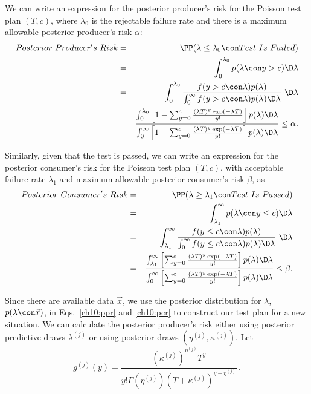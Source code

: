 \documentclass {book}
\begin{document}
We can write an expression for the posterior producer's
risk for the Poisson test
plan $(T,c)$, where $\lambda_{0}$ is
the rejectable failure rate and there is a maximum allowable
posterior producer's risk $\alpha$:
\begin{eqnarray}\label{ch10:ppr}
Posterior\mbox{ }Producer's\mbox{ }Risk & = &
\PP(\lambda \leq \lambda_{0}\con Test\mbox{ }Is\mbox{ }Failed)\\
\mbox{} & = & \int_{0}^{\lambda_0} p(\lambda \con y > c) \D \lambda \nonumber\\
\mbox{} & = & \int_{0}^{\lambda_0} \frac{f(y > c \con \lambda)
p(\lambda)}{\int_{0}^{\infty} f(y > c \con \lambda) p(\lambda) \D \lambda} \,\, \D \lambda \nonumber\\
\mbox{} & = & \frac{\int_{0}^{\lambda_0} \left[1-
\sum^{c}_{y=0}\frac{(\lambda T)^y \exp(-\lambda T)}{y!} \right]
p(\lambda) \D \lambda}{\int_{0}^{\infty} \left[ 1- \sum^{c}_{y=0}
\frac{(\lambda T)^y \exp(-\lambda T)}{y!} \right] p(\lambda) \D
\lambda}\nonumber \leq \alpha.\nonumber
\end{eqnarray}

Similarly, given that the test is passed, we can write an
expression for the posterior consumer's
risk for the Poisson test
plan $(T,c)$, with acceptable
failure rate $\lambda_{1}$ and maximum allowable posterior
consumer's risk $\beta$, as
\begin{eqnarray}\label{ch10:pcr}
Posterior\mbox{ }Consumer's\mbox{ }Risk & = &
\PP(\lambda \geq \lambda_{1}\con Test\mbox{ }Is\mbox{ }Passed)\\
\mbox{} & = & \int_{\lambda_1}^{\infty} p(\lambda \con y \leq c) \D \lambda \nonumber\\
\mbox{} & = & \int_{\lambda_1}^{\infty} \frac{f(y \leq c \con
\lambda)
p(\lambda)}{\int_{0}^{\infty} f(y \leq c \con \lambda) p(\lambda) \D \lambda} \,\, \D \lambda \nonumber\\
\mbox{} & = & \frac{\int_{\lambda_1}^{\infty} \left[
\sum^{c}_{y=0}\frac{(\lambda T)^y \exp(-\lambda T)}{y!} \right]
p(\lambda) \D \lambda}{\int_{0}^{\infty} \left[\sum^{c}_{y=0}
\frac{(\lambda T)^y \exp(-\lambda T)}{y!} \right] p(\lambda) \D
\lambda}\nonumber \leq \beta.\nonumber
\end{eqnarray}

Since there are available data $\vec{x}$, we use the posterior
distribution for $\lambda$, $p(\lambda \con \vec{x})$, in
Eqs.~\ref{ch10:ppr} and \ref{ch10:pcr} to construct our test plan
for a new situation. We can calculate the posterior producer's
risk either using posterior predictive draws $\lambda^{(j)}$ or
using posterior draws $(\eta^{(j)}, \kappa^{(j)})$. Let
\begin{displaymath}
g^{(j)}(y) = \frac {(\kappa^{(j)})^{\eta^{(j)}}T^{y}}{y!
\Gamma(\eta^{(j)})(T+\kappa^{(j)})^{y+\eta^{(j)}}} \, .
\end{displaymath}
\end{document}
